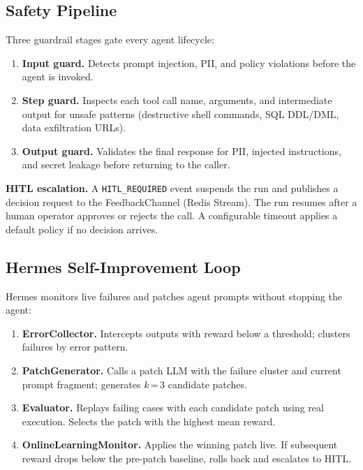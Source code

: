 \documentclass[conference]{IEEEtran}
\begin{document}
\subsection{Safety Pipeline}
\label{sec:safety}

Three guardrail stages gate every agent lifecycle:

\begin{enumerate}[noitemsep]
  \item \textbf{Input guard.} Detects prompt injection, PII, and policy
    violations before the agent is invoked.
  \item \textbf{Step guard.} Inspects each tool call name, arguments,
    and intermediate output for unsafe patterns (destructive shell
    commands, SQL DDL/DML, data exfiltration URLs).
  \item \textbf{Output guard.} Validates the final response for PII,
    injected instructions, and secret leakage before returning to the
    caller.
\end{enumerate}

\textbf{HITL escalation.} A \texttt{HITL\_REQUIRED} event suspends the
run and publishes a decision request to the FeedbackChannel (Redis
Stream). The run resumes after a human operator approves or rejects the
call. A configurable timeout applies a default policy if no decision
arrives.

\subsection{Hermes Self-Improvement Loop}
\label{sec:hermes_arch}

Hermes monitors live failures and patches agent prompts without stopping
the agent:

\begin{enumerate}[noitemsep]
  \item \textbf{ErrorCollector.} Intercepts outputs with reward below a
    threshold; clusters failures by error pattern.
  \item \textbf{PatchGenerator.} Calls a patch LLM with the failure
    cluster and current prompt fragment; generates $k$\,=\,3 candidate
    patches.
  \item \textbf{Evaluator.} Replays failing cases with each candidate
    patch using real execution. Selects the patch with the highest mean
    reward.
  \item \textbf{OnlineLearningMonitor.} Applies the winning patch live.
    If subsequent reward drops below the pre-patch baseline, rolls back
    and escalates to HITL.
\end{enumerate}
\end{document}
